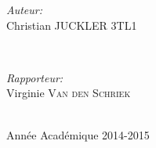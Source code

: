 \begin{titlepage}
\begin{minipage}{0.4\textwidth}
\begin{flushleft} \large
\emph{Auteur:}\\
Christian \textsc{JUCKLER} 3TL1 %
\end{flushleft}
\end{minipage}\\[1cm]
\begin{minipage}{0.4\textwidth}
\begin{flushleft} \large
\emph{Rapporteur:} \\
Virginie \textsc{Van den Schriek} %
\end{flushleft}
\end{minipage}\\[4cm]



{\large Année Académique 2014-2015}\\[3cm] %

\vfill %

\end{titlepage}